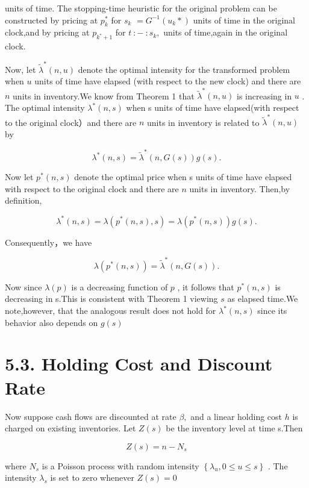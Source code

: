 units of time. The stopping-time heuristic for the original problem can
be constructed by pricing at \({ p } _ { k } ^ { * }\) for \(s _ { k }\)
\(= G ^ { - 1 } ( u _ { k } \ast )\) units of time in the original
clock,and by pricing at \(p _ { k ^ { * } + 1 }\) for
\(t \ : - \ : s _ { k } ,\) units of time,again in the original clock.

Now, let \(\tilde { \lambda } ^ { * } ( n , u )\) denote the optimal
intensity for the transformed problem when \(u\) units of time have
elapsed (with respect to the new clock) and there are \(n\) units in
inventory.We know from Theorem 1 that
\(\tilde { \lambda } ^ { * } ( n , u )\) is increasing in \(u\) . The
optimal intensity \(\lambda ^ { * } ( n , s )\) when s units of time
have elapsed(with respect to the original clock）and there are \(n\)
units in inventory is related to
\(\tilde { \lambda } ^ { * } ( n , u )\) by

\[
\lambda ^ { * } ( n , s ) = \tilde { \lambda } ^ { * } ( n , G ( s ) ) g ( s ) .
\]

Now let \(p ^ { * } ( n , s )\) denote the optimal price when s units of
time have elapsed with respect to the original clock and there are \(n\)
units in inventory. Then,by definition,

\[
\lambda ^ { * } ( n , s ) = \lambda ( p ^ { * } ( n , s ) , s ) = \lambda ( p ^ { * } ( n , s ) ) g ( s ) .
\]

Consequently，we have

\[
\lambda ( p ^ { * } ( n , s ) ) = \tilde { \lambda } ^ { * } ( n , G ( s ) ) .
\]

Now since \(\lambda ( p )\) is a decreasing function of \(p\) , it
follows that \(p ^ { * } ( n , s )\) is decreasing in s.This is
consistent with Theorem 1 viewing \(s\) as elapsed time.We note,however,
that the analogous result does not hold for
\(\lambda ^ { * } ( n , s )\) since its behavior also depends on
\(g ( s )\)

\section{5.3. Holding Cost and Discount
Rate}\label{holding-cost-and-discount-rate}

Now suppose cash flows are discounted at rate \(\beta ,\) and a linear
holding cost \(h\) is charged on existing inventories. Let \(Z ( s )\)
be the inventory level at time s.Then

\[
Z ( s ) = n - N _ { s }
\]

where \(N _ { s }\) is a Poisson process with random intensity
\(\left\{ \lambda _ { u } , 0 \le u \le s \right\}\) . The intensity
\(\lambda _ { s }\) is set to zero whenever \(Z ( s ) = 0\)

